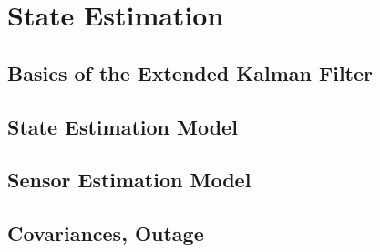 \chapter{State Estimation}\label{cha3}
\section{Basics of the Extended Kalman Filter}
\section{State Estimation Model}
\section{Sensor Estimation Model}
\section{Covariances, Outage}
